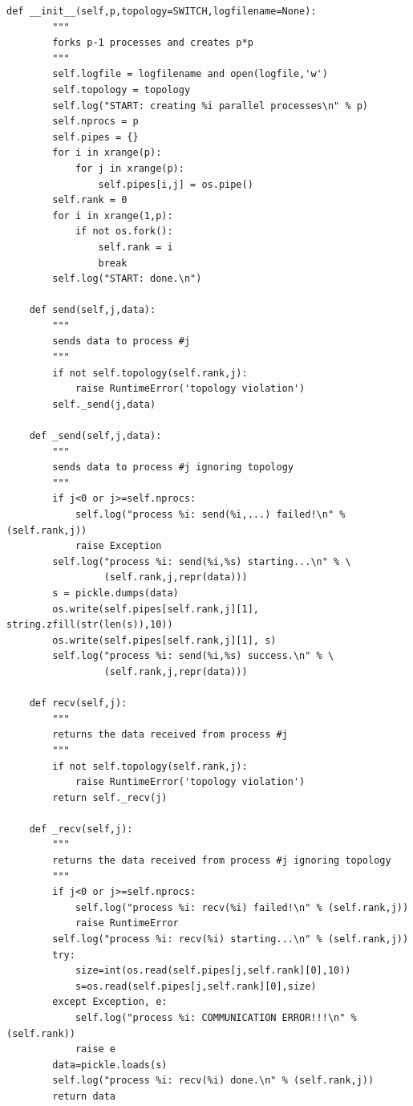 \documentclass[justified,sixbynine]{tufte-book}
\def\ft{\small\tt}
\theoremstyle{plain}%
\theoremstyle{definition}
\theoremstyle{remark}
\begin{document}
\begin{fullwidth}
\begin{lstlisting}[caption={in file: {\ft psim.py}}]
    def __init__(self,p,topology=SWITCH,logfilename=None):
        """
        forks p-1 processes and creates p*p
        """
        self.logfile = logfilename and open(logfile,'w')
        self.topology = topology
        self.log("START: creating %i parallel processes\n" % p)
        self.nprocs = p
        self.pipes = {}
        for i in xrange(p):
            for j in xrange(p):
                self.pipes[i,j] = os.pipe()
        self.rank = 0
        for i in xrange(1,p):
            if not os.fork():
                self.rank = i
                break
        self.log("START: done.\n")

    def send(self,j,data):
        """
        sends data to process #j
        """
        if not self.topology(self.rank,j):
            raise RuntimeError('topology violation')
        self._send(j,data)

    def _send(self,j,data):
        """
        sends data to process #j ignoring topology
        """
        if j<0 or j>=self.nprocs:
            self.log("process %i: send(%i,...) failed!\n" % (self.rank,j))
            raise Exception
        self.log("process %i: send(%i,%s) starting...\n" % \
                 (self.rank,j,repr(data)))
        s = pickle.dumps(data)
        os.write(self.pipes[self.rank,j][1], string.zfill(str(len(s)),10))
        os.write(self.pipes[self.rank,j][1], s)
        self.log("process %i: send(%i,%s) success.\n" % \
                 (self.rank,j,repr(data)))

    def recv(self,j):
        """
        returns the data received from process #j
        """
        if not self.topology(self.rank,j):
            raise RuntimeError('topology violation')
        return self._recv(j)

    def _recv(self,j):
        """
        returns the data received from process #j ignoring topology
        """
        if j<0 or j>=self.nprocs:
            self.log("process %i: recv(%i) failed!\n" % (self.rank,j))
            raise RuntimeError
        self.log("process %i: recv(%i) starting...\n" % (self.rank,j))
        try:
            size=int(os.read(self.pipes[j,self.rank][0],10))
            s=os.read(self.pipes[j,self.rank][0],size)
        except Exception, e:
            self.log("process %i: COMMUNICATION ERROR!!!\n" % (self.rank))
            raise e
        data=pickle.loads(s)
        self.log("process %i: recv(%i) done.\n" % (self.rank,j))
        return data

\end{lstlisting}


\end{fullwidth}
\end{document}
